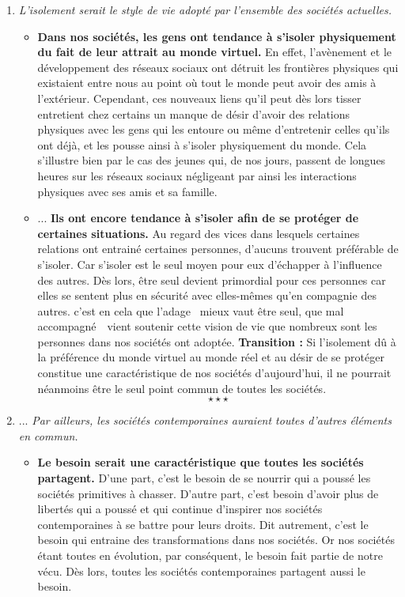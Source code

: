 \begin{enumerate}[label*=$\longrightarrow$]
	\item \textit{L'isolement serait le style de vie adopté par l'ensemble des sociétés actuelles.}
	\begin{itemize}
		\item \textbf{Dans nos sociétés, les gens ont tendance à s'isoler physiquement du fait de leur attrait au monde virtuel.} En effet, l'avènement et le développement des réseaux sociaux ont détruit les frontières physiques qui existaient entre nous au point où tout le monde peut avoir des amis à l'extérieur. Cependant, ces nouveaux liens qu'il peut dès lors tisser entretient chez certains un manque de désir d'avoir des relations physiques avec les gens qui les entoure ou même d'entretenir celles qu'ils ont déjà, et les pousse ainsi à s'isoler physiquement du monde. Cela s'illustre bien par le cas des jeunes qui, de nos jours, passent de longues heures sur les réseaux sociaux négligeant par ainsi les interactions physiques avec ses amis et sa famille.
		\item ... \textbf{Ils ont encore tendance à s'isoler afin de se protéger de certaines situations.} Au regard des vices dans lesquels certaines relations ont entrainé certaines personnes, d'aucuns trouvent préférable de s'isoler. Car s'isoler est le seul moyen pour eux d'échapper à l'influence des autres. Dès lors, être seul devient primordial pour ces personnes car elles se sentent plus en sécurité avec elles-mêmes qu'en compagnie des autres. c'est en cela que l'adage \guillemetleft\ mieux vaut être seul, que mal accompagné\ \guillemetright\ vient soutenir cette vision de vie que nombreux sont les personnes dans nos sociétés ont adoptée. \newline \textbf{Transition :} Si l'isolement dû à la préférence du monde virtuel au monde réel et au désir de se protéger constitue une caractéristique de nos sociétés d'aujourd'hui, il ne pourrait néanmoins être le seul point commun de toutes les sociétés.$$\star \star \star$$
	\end{itemize}
	\item ... \textit{Par ailleurs, les sociétés contemporaines auraient toutes d'autres éléments en commun.}
	\begin{itemize}
		\item \textbf{Le besoin serait une caractéristique que toutes les sociétés partagent.} D'une part, c'est le besoin de se nourrir qui a poussé les sociétés primitives à chasser. D'autre part, c'est besoin d'avoir plus de libertés qui a poussé et qui continue d'inspirer nos sociétés contemporaines à se battre pour leurs droits. Dit autrement, c'est le besoin qui entraine des transformations dans nos sociétés. Or nos sociétés étant toutes en évolution, par conséquent, le besoin fait partie de notre vécu. Dès lors, toutes les sociétés contemporaines partagent aussi le besoin.

\end{itemize}
\end{enumerate}
